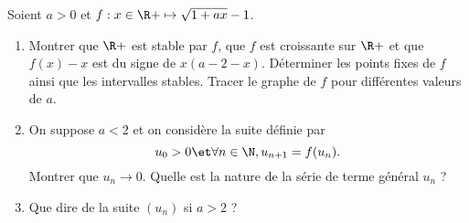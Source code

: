 \begin{enonce}
\begin{exercise}[ID={RMS 122-2 E1326 TPE PC},subtitle={},tags={mpsi}]
Soient $a>0$ et $f:x\in\R+\mapsto \sqrt{1+ax}-1$.
\begin{enumerate}
  \item Montrer que $\R+$ est stable par $f$, que $f$ est croissante sur $\R+$ et que $f(x)-x$ est du signe de $x(a-2-x)$. Déterminer les points fixes de $f$ ainsi que les intervalles stables.
    Tracer le graphe de $f$ pour différentes valeurs de $a$.
  \item On suppose $a<2$ et on considère la suite définie par
    \begin{equation*}
      u_0>0 \et \forall n\in\N, u_{n+1}=f(u_n).
    \end{equation*}
    Montrer que $u_n\to 0$. Quelle est la nature de la série de terme général $u_n$ ?
  \item Que dire de la suite $(u_n)$ si $a>2$ ?
\end{enumerate}  
\end{exercise}
\begin{solution}
\end{solution}
\end{enonce}
